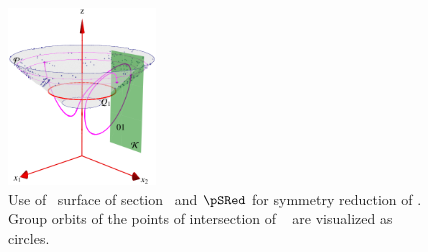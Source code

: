 \begin{figure}[ht]
\begin{center}
  \includegraphics[width=0.35\textwidth,clip=true]{../figs/CLEmartini}
\end{center}
\caption{
Use of \Poincare\ surface of section \PoincS\ and {\slice}
$\pSRed$ for symmetry reduction of \cLf. Group orbits of the
points of intersection of \rpo\  are visualized as
circles.
    }
\label{fig:CLEmartini}
\end{figure}
